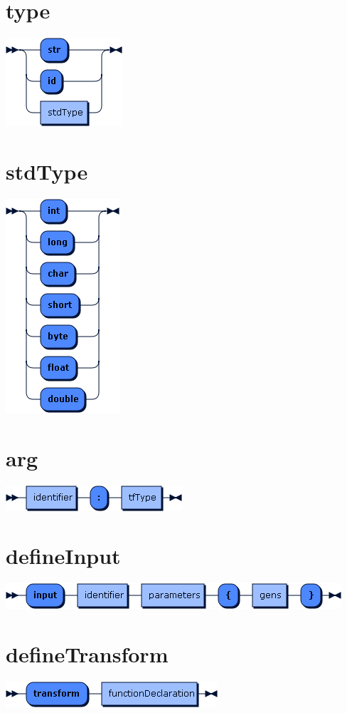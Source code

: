 \begin{appendices}
\section*{type}\includegraphics[scale=0.7]{img/ebnf_grammar/type}
\section*{stdType}\includegraphics[scale=0.7]{img/ebnf_grammar/stdType}
\section*{arg}\includegraphics[scale=0.7]{img/ebnf_grammar/arg}

\section*{defineInput}\includegraphics[scale=0.7]{img/ebnf_grammar/defineInput}
\section*{defineTransform}\includegraphics[scale=0.7]{img/ebnf_grammar/defineTransform}

\end{appendices}
